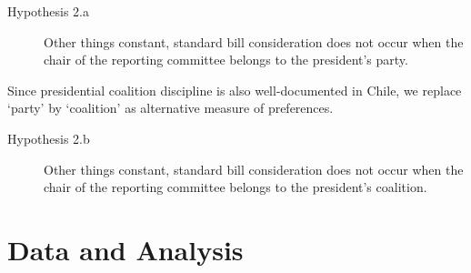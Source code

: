 \documentclass[letter,12pt]{article}
\begin{document}
\begin{description}
  \item [Hypothesis 2.a] Other things constant, standard bill consideration does not occur when the chair of the reporting committee belongs to the president's party. 
\end{description}

\noindent Since presidential coalition discipline is also well-documented in Chile, we replace `party' by `coalition' as alternative measure of preferences. 

\begin{description}
  \item [Hypothesis 2.b] Other things constant, standard bill consideration does not occur when the chair of the reporting committee belongs to the president's coalition. 
\end{description}




\section{Data and Analysis}
\end{document}
